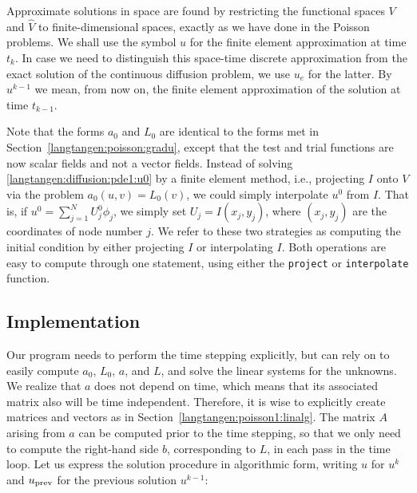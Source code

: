 Approximate solutions in space
are found by
restricting the functional spaces $V$ and $\hat V$
to finite-dimensional spaces,
exactly as we have done in the Poisson problems.
We shall use the symbol $u$ for the finite element
approximation at time $t_k$. In case we need to distinguish this 
space-time discrete approximation from the exact solution of
the continuous diffusion problem, we use $u_e$ for the latter.
By $u^{k-1}$ we mean, from now on, the finite element approximation
of the solution at time $t_{k-1}$.

Note that the forms $a_0$ and $L_0$ are identical to the forms
met in Section~\ref{langtangen:poisson:gradu}, except that the test and trial
functions are now
scalar fields and not a vector fields.
Instead of solving \eqref{langtangen:diffusion:pde1:u0} by a finite
element method, i.e., projecting $I$ onto $V$ via
the problem $a_0(u,v)=L_0(v)$, we could simply interpolate $u^0$ from
$I$. That is, if $u^0=\sum_{j=1}^N U^0_j\phi_j$, we 
simply set $U_j=I(x_j,y_j)$, where $(x_j,y_j)$ are the coordinates of
node number $j$. We refer to these two strategies as computing
the initial condition by either projecting $I$ or interpolating $I$.
Both operations are easy to compute through one statement, using either
the {\fontsize{10pt}{10pt}\texttt{project}} or {\fontsize{10pt}{10pt}\texttt{interpolate}} function.


\subsection{Implementation}
\label{langtangen:timedep:diffusion1:impl}

Our program needs to perform the time stepping explicitly, but can
rely on \fenics{} to easily compute $a_0$, $L_0$, $a$, and $L$,
and solve the linear systems for the unknowns.
We realize that $a$ does not depend on time, which means that its
associated matrix also will be time independent. Therefore, it is wise to
explicitly
create matrices and vectors as in Section~\ref{langtangen:poisson1:linalg}.
The matrix $A$ arising from $a$ can be computed prior to the time stepping,
so that we
only need to compute the right-hand side $b$, corresponding to $L$,
in each pass in the time loop. Let us express the
solution procedure in algorithmic form, writing 
$u$ for $u^k$ and $u_{\rm prev}$
for the previous solution $u^{k-1}$:

